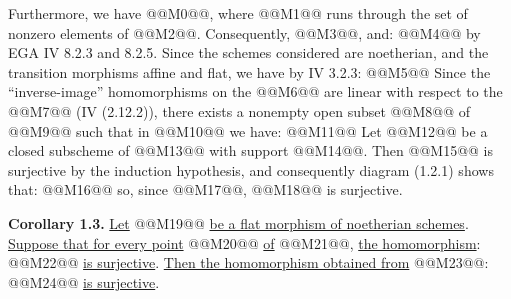 Furthermore,
we have @@M0@@, where @@M1@@ runs through the set of nonzero elements of @@M2@@. Consequently, @@M3@@, and:
@@M4@@
by EGA IV 8.2.3 and 8.2.5. Since the schemes considered are noetherian, and the transition morphisms affine and flat, we have by IV 3.2.3:
@@M5@@
Since the ``inverse-image'' homomorphisms on the @@M6@@ are linear with respect to the @@M7@@ (IV (2.12.2)), there exists a nonempty open subset @@M8@@ of @@M9@@ such that in @@M10@@ we have:
@@M11@@
Let @@M12@@ be a closed subscheme of @@M13@@ with support @@M14@@. Then @@M15@@ is surjective by the induction hypothesis, and consequently diagram (1.2.1) shows that:
@@M16@@
so, since @@M17@@, @@M18@@ is surjective.

\textbf{Corollary 1.3.} \uline{Let} @@M19@@ \uline{be a flat morphism of noetherian schemes}. \uline{Suppose that for every point} @@M20@@ \uline{of} @@M21@@, \uline{the homomorphism}:
@@M22@@
\uline{is surjective}. \uline{Then the homomorphism obtained from} @@M23@@:
@@M24@@
\uline{is surjective}.
